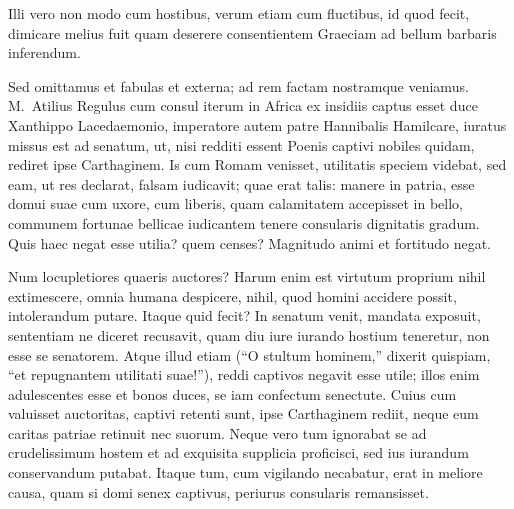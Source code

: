 
Illi vero non modo cum hostibus, verum etiam cum fluctibus, id quod fecit, dimicare melius fuit quam deserere consentientem Graeciam ad bellum barbaris inferendum.

Sed omittamus et fabulas et externa; ad rem factam nostramque veniamus. M.~Atilius Regulus cum consul iterum in Africa ex insidiis captus esset duce Xanthippo Lacedaemonio, imperatore autem patre Hannibalis Hamilcare, iuratus missus est ad senatum, ut, nisi redditi essent Poenis captivi nobiles quidam, rediret ipse Carthaginem. Is cum Romam venisset, utilitatis speciem videbat, sed eam, ut res declarat, falsam iudicavit; quae erat talis: manere in patria, esse domui suae cum uxore, cum liberis, quam calamitatem accepisset in bello, communem fortunae bellicae iudicantem tenere consularis dignitatis gradum. Quis haec negat esse utilia? quem censes? Magnitudo animi et fortitudo negat.

Num locupletiores quaeris auctores? Harum enim est virtutum proprium nihil extimescere, omnia humana despicere, nihil, quod homini accidere possit, intolerandum putare. Itaque quid fecit? In senatum venit, mandata exposuit, sententiam ne diceret recusavit, quam diu iure iurando hostium teneretur, non esse se senatorem. Atque illud etiam (``O stultum hominem,'' dixerit quispiam, ``et repugnantem utilitati suae!''), reddi captivos negavit esse utile; illos enim adulescentes esse et bonos duces, se iam confectum senectute. Cuius cum valuisset auctoritas, captivi retenti sunt, ipse Carthaginem rediit, neque eum caritas patriae retinuit nec suorum. Neque vero tum ignorabat se ad crudelissimum hostem et ad exquisita supplicia proficisci, sed ius iurandum conservandum putabat. Itaque tum, cum vigilando necabatur, erat in meliore causa, quam si domi senex captivus, periurus consularis remansisset.
